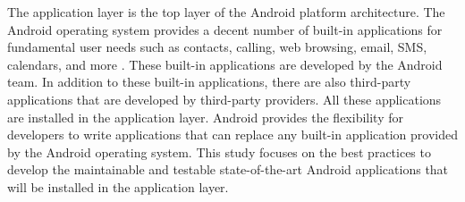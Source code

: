The application layer is the top layer of the Android platform architecture. The Android operating system provides a decent number of built-in applications for fundamental user needs such as contacts, calling, web browsing, email, SMS, calendars, and more \cite{7}. These built-in applications are developed by the Android team. In addition to these built-in applications, there are also third-party applications that are developed by third-party providers. All these applications are installed in the application layer. Android provides the flexibility for developers to write applications that can replace any built-in application provided by the Android operating system. This study focuses on the best practices to develop the maintainable and testable state-of-the-art Android applications that will be installed in the application layer.